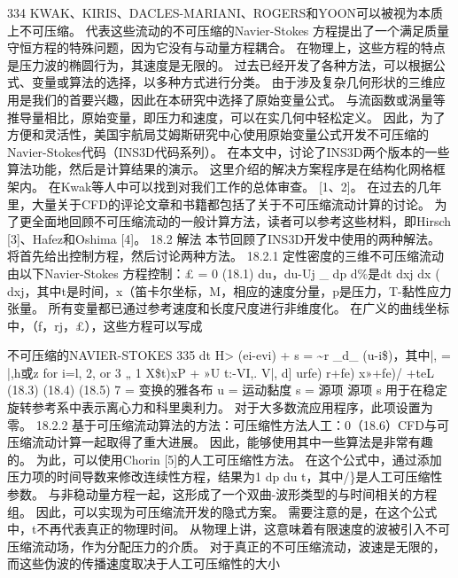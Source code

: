 \documentclass[UTF8,11pt,a4paper,openany,fontset=fandol]{ctexbook}
\begin{document}
334 KWAK、KIRIS、DACLES-MARIANI、ROGERS和YOON可以被视为本质上不可压缩。 代表这些流动的不可压缩的Navier-Stokes 方程提出了一个满足质量守恒方程的特殊问题，因为它没有与动量方程耦合。 在物理上，这些方程的特点是压力波的椭圆行为，其速度是无限的。 过去已经开发了各种方法，可以根据公式、变量或算法的选择，以多种方式进行分类。 由于涉及复杂几何形状的三维应用是我们的首要兴趣，因此在本研究中选择了原始变量公式。 与流函数或涡量等推导量相比，原始变量，即压力和速度，可以在实几何中轻松定义。 因此，为了方便和灵活性，美国宇航局艾姆斯研究中心使用原始变量公式开发不可压缩的Navier-Stokes代码（INS3D代码系列）。 在本文中，讨论了INS3D两个版本的一些算法功能，然后是计算结果的演示。 这里介绍的解决方案程序是在结构化网格框架内。 在Kwak等人中可以找到对我们工作的总体审查。 [1、2]。 在过去的几年里，大量关于CFD的评论文章和书籍都包括了关于不可压缩流动计算的讨论。 为了更全面地回顾不可压缩流动的一般计算方法，读者可以参考这些材料，即Hirsch [3]、Hafez和Oshima [4]。 18.2 解法 本节回顾了INS3D开发中使用的两种解法。 将首先给出控制方程，然后讨论两种方法。 18.2.1 定性密度的三维不可压缩流动由以下Navier-Stokes 方程控制：£ = 0 (18.1) du，du-Uj \_ dp d\%是dt dxj dx ( dxj，其中t是时间，x（笛卡尔坐标，M，相应的速度分量，p是压力，T-黏性应力张量。 所有变量都已通过参考速度和长度尺度进行非维度化。 在广义的曲线坐标中，（f，rj，£），这些方程可以写成

不可压缩的NAVIER-STOKES 335 dt H> (ei-evi) + s = \textasciitilde{}r \_d\_ (u-i\$)，其中|, = |,h或z for i=l, 2, or 3 „ 1 X\$t)xP + »U t:-VI,. V|, d] urfe) r+fe) x»+fe)/ +teL (18.3) (18.4) (18.5) 7 = 变换的雅各布 u = 运动黏度 s = 源项 源项 s 用于在稳定旋转参考系中表示离心力和科里奥利力。 对于大多数流应用程序，此项设置为零。 18.2.2 基于可压缩流动算法的方法：可压缩性方法人工：0（18.6）CFD与可压缩流动计算一起取得了重大进展。 因此，能够使用其中一些算法是非常有趣的。 为此，可以使用Chorin [5]的人工可压缩性方法。 在这个公式中，通过添加压力项的时间导数来修改连续性方程，结果为1 dp du t，其中/\}是人工可压缩性参数。 与非稳动量方程一起，这形成了一个双曲-波形类型的与时间相关的方程组。 因此，可以实现为可压缩流开发的隐式方案。 需要注意的是，在这个公式中，t不再代表真正的物理时间。 从物理上讲，这意味着有限速度的波被引入不可压缩流动场，作为分配压力的介质。 对于真正的不可压缩流动，波速是无限的，而这些伪波的传播速度取决于人工可压缩性的大小
\end{document}

